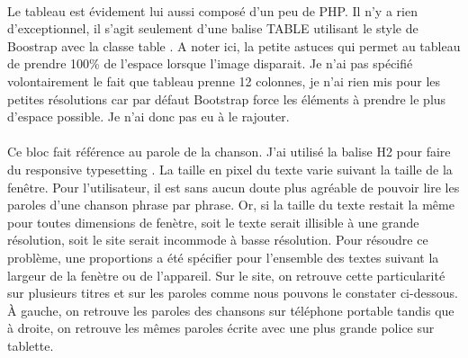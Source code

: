 \documentclass{article}
\begin{document}
\vspace{0.5cm}\\
Le tableau est \'evidement lui aussi compos\'e d'un peu de PHP. Il n'y a rien d'exceptionnel, il s'agit seulement d'une balise TABLE utilisant le style de Boostrap avec la classe \og table \fg{}. A noter ici, la petite astuces qui permet au tableau de prendre 100\% de l'espace lorsque l'image disparait. Je n'ai pas sp\'ecifi\'e volontairement le fait que tableau prenne 12 colonnes, je n'ai rien mis pour les petites r\'esolutions car par d\'efaut Bootstrap force les \'el\'ements \`a prendre le plus d'espace possible. Je n'ai donc pas eu \`a le rajouter. 
\vspace{0.5cm}\\
\vspace{0.5cm}\\
Ce bloc fait r\'ef\'erence au parole de la chanson. J'ai utilis\'e la balise H2 pour faire du \og responsive typesetting \fg{}. La taille en pixel du texte varie suivant la taille de la fen\^etre. Pour l'utilisateur, il est sans aucun doute plus agr\'eable de pouvoir lire les paroles d'une chanson phrase par phrase. Or, si la taille du texte restait la m\^eme pour toutes dimensions de fen\`etre, soit le texte serait illisible \`a une grande r\'esolution, soit le site serait incommode \`a basse r\'esolution. Pour r\'esoudre ce probl\`eme, une proportions a \'et\'e sp\'ecifier pour l'ensemble des textes suivant la largeur de la fen\`etre ou de l'appareil. Sur le site, on retrouve cette particularit\'e sur plusieurs titres et sur les paroles comme nous pouvons le constater ci-dessous. \`A gauche, on retrouve les paroles des chansons sur t\'el\'ephone portable tandis que \`a droite, on retrouve les m\^emes paroles \'ecrite avec une plus grande police sur tablette.
\end{document}
